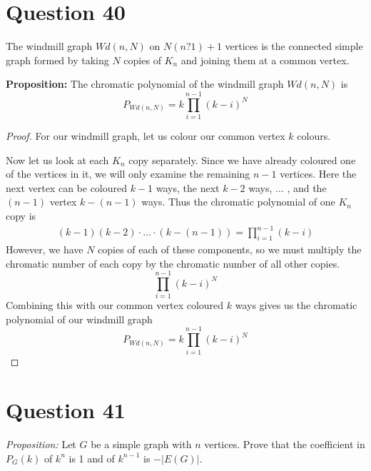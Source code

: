 \documentclass[11pt, oneside]{article}   	%
\begin{document}
\section*{Question 40}

The windmill graph $Wd(n, N)$ on $N(n ? 1) + 1$ vertices is the connected simple graph formed by taking $N$ copies of $K_n$ and joining them at a common vertex. 

\textbf{Proposition:}  The chromatic polynomial of the windmill graph $Wd(n, N)$ is $$P_{Wd(n,N)} = k \prod_{i=1}^{n-1} (k-i)^N$$

\begin{proof}
For our windmill graph, let us colour our common vertex $k$ colours.

Now let us look at each $K_n$ copy separately. Since we have already coloured one of the vertices in it, we will only examine the remaining $n-1$ vertices. Here the next vertex can be coloured $k-1$ ways, the next $k-2$ ways, ... , and the $(n-1)$ vertex $k-(n-1)$ ways. Thus the chromatic polynomial of one $K_n$ copy is
	\begin{align*}
		(k-1)(k-2)\cdot \ldots \cdot (k-(n-1)) = \prod_{i=1}^{n-1} (k-i)
	\end{align*}
However, we have $N$ copies of each of these components, so we must multiply the chromatic number of each copy by the chromatic number of all other copies.
$$\prod_{i=1}^{n-1} (k-i)^N$$
Combining this with our common vertex coloured $k$ ways gives us the chromatic polynomial of our windmill graph
 $$P_{Wd(n,N)} = k \prod_{i=1}^{n-1} (k-i)^N$$
\end{proof}



\section*{Question 41}

\emph{Proposition:} Let $G$ be a simple graph with $n$ vertices. Prove that the coefficient in $P_G(k)$ of $k^n$ is 1 and of $k^{n-1}$ is $-|E(G)|$.
\end{document}
